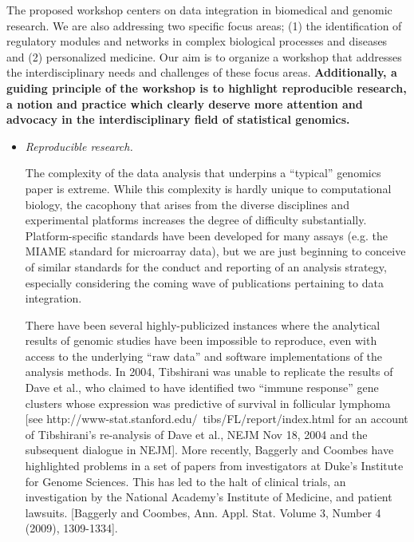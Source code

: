 \documentclass[12pt]{amsart}
\begin{document}
The proposed workshop centers on data integration in biomedical and
genomic research. We are also addressing two specific focus areas; (1)
the identification of regulatory modules and networks in complex
biological processes and diseases and (2) personalized medicine. Our
aim is to organize a workshop that addresses the interdisciplinary
needs and challenges of these focus areas. \textbf{Additionally, a
  guiding principle of the workshop is to highlight reproducible
  research, a notion and practice which clearly deserve more attention
  and advocacy in the interdisciplinary field of statistical
  genomics.}
\begin{itemize}

\item \textit{Reproducible research.}

  The complexity of the data analysis that underpins a ``typical''
  genomics paper is extreme.  While this complexity is hardly unique
  to computational biology, the cacophony that arises from the diverse
  disciplines and experimental platforms increases the degree of
  difficulty substantially.  Platform-specific standards have been
  developed for many assays (e.g. the MIAME standard for microarray
  data), but we are just beginning to conceive of similar standards
  for the conduct and reporting of an analysis strategy, especially
  considering the coming wave of publications pertaining to data
  integration.

  There have been several highly-publicized instances where the
  analytical results of genomic studies have been impossible to
  reproduce, even with access to the underlying ``raw data'' and
  software implementations of the analysis methods.  In 2004,
  Tibshirani was unable to replicate the results of Dave et al., who
  claimed to have identified two ``immune response'' gene clusters
  whose expression was predictive of survival in follicular lymphoma
  [see http://www-stat.stanford.edu/~tibs/FL/report/index.html for an
  account of Tibshirani's re-analysis of Dave et al., NEJM Nov 18,
  2004 and the subsequent dialogue in NEJM].  More recently, Baggerly
  and Coombes have highlighted problems in a set of papers from
  investigators at Duke's Institute for Genome Sciences.  This has led
  to the halt of clinical trials, an investigation by the National
  Academy's Institute of Medicine, and patient lawsuits.  [Baggerly
  and Coombes, Ann. Appl. Stat. Volume 3, Number 4 (2009), 1309-1334].


\end{itemize}
\end{document}
